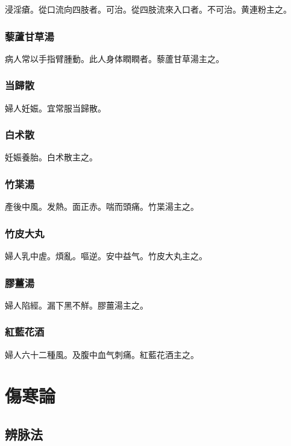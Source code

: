\documentclass[12pt,twoside,UTF8,b5paper]{ctexbook}
\begin{document}
浸淫瘡。從口流向四肢者。可治。從四肢流來入口者。不可治。黄連粉主之。

\section{藜蘆甘草湯}

病人常以手指臂腫動。此人身体瞤瞤者。藜蘆甘草湯主之。

\section{当歸散}

婦人妊娠。宜常服当歸散。

\section{白术散}

妊娠養胎。白术散主之。

\section{竹枼湯}

產後中風。发熱。面正赤。喘而頭痛。竹枼湯主之。

\section{竹皮大丸}

婦人乳中虗。煩亂。嘔逆。安中益气。竹皮大丸主之。

\section{膠薑湯}

婦人陷經。漏下黑不觧。膠薑湯主之。

\section{紅藍花酒}

婦人六十二種風。及腹中血气刺痛。紅藍花酒主之。

\part{傷寒論}

\chapter{辨脉法}
\end{document}
